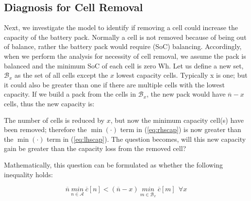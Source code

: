 \documentclass[10pt,twocolumn]{IEEEtran}
\begin{document}
\subsection{Diagnosis for Cell Removal }
Next, we investigate the model to identify if removing a cell could increase the capacity of the battery pack.
Normally  a cell is not removed because of being out of balance,  rather the battery  pack would require (SoC) balancing.
Accordingly,  when we perform the  analysis for necessity of cell removal, we assume the pack is balanced and the minimum SoC of each cell is zero Wh.
Let us define a new set, $\mathcal{B}_x$ as the set of all cells except the $x$ lowest capacity cells.
Typically x is one; but it could also be greater than one if there are multiple cells with the lowest capacity.
If we build a pack from the cells in  $\mathcal{B}_x$, the new pack would have $\overline{n} - x$ cells, thus the new capacity is:


The number of cells is reduced by $x$, but now the minimum capacity cell(s) have been removed; therefore the $\min(\cdot)$ term in (\ref{eq:rhscap}) is now greater than the $\min(\cdot)$ term in (\ref{eq:lhscap}). The question becomes, will this new capacity gain be greater than the capacity loss from the removed cell?

Mathematically, this question can be formulated as whether the following inequality holds:

\begin{equation}
\overline{n} \  \underset{n\in \mathcal{A}}{min} \ \overline c[n] < (\overline{n}-x) \ \underset{m\in \mathcal{B}_x}{min} \ \overline c[m] \ \  \forall x
\label{eq:removecellineq}
\end{equation}
\end{document}

